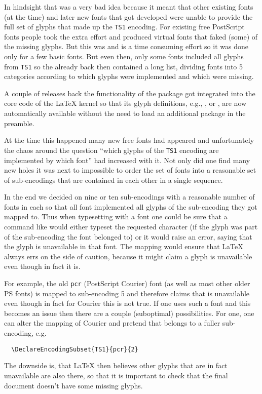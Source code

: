 \documentclass{ltnews}
\begin{document}
In hindsight that was a very bad idea because it meant that other
existing fonts (at the time) and later new fonts that got developed
were unable to provide the full set of glyphs that made up the
\texttt{TS1} encoding. For existing free PostScript fonts people 
took the extra effort and produced virtual fonts that faked (some) of
the missing glyphs. But this was and is a time consuming effort so it
was done only for a few basic fonts. But even then, only some fonts
included all glyphs from \texttt{TS1} so the  already
back then contained a long list, dividing fonts into 5 categories
according to which glyphs were implemented and which were missing.

A couple of releases back the functionality of the 
package got integrated into the core code of the \LaTeX{} kernel so
that its glyph definitions, e.g., ,  or
, are now automatically available without the need to load
an additional package in the preamble.

At the time this happened many new free fonts had appeared and
unfortunately the chaos around the question \enquote{which glyphs of
  the \texttt{TS1} encoding are implemented by which font} had
increased with it. Not only did one find many new holes it was next to
impossible to order the set of fonts into a reasonable set of
sub-encodings that are contained in each other in a single sequence.

In the end we decided on nine or ten sub-encodings with a reasonable
number of fonts %
in each so that all font implemented all glyphs of the
sub-encoding they got mapped to. Thus when typesetting with a font one
could be sure that a command like  would either
typeset the requested character (if the glyph was part of the
sub-encoding the font belonged to) or it would raise an error, saying
that the glyph is unavailable in that %
font.
The mapping would ensure
that \LaTeX{} always errs on the side of caution, because it might
claim a glyph is unavailable even though in fact it is.

For example, the old \texttt{pcr} (PostScript Courier) font (as well
as most other older PS fonts) is mapped to sub-encoding 5 and
therefore claims that  is unavailable even though
in fact for Courier this is not true. If one uses such a font and this
becomes an issue then there are a couple (suboptimal) possibilities.
For one, one can alter the mapping of Courier and pretend that belongs
to a fuller sub-encoding, e.g.
\begin{verbatim}
  \DeclareEncodingSubset{TS1}{pcr}{2}
\end{verbatim}
The downside is, that \LaTeX{} then believes other glyphs that are in fact
unavailable are also there, so that it is important to check that the
final document doesn't have some missing glyphs.
\end{document}
